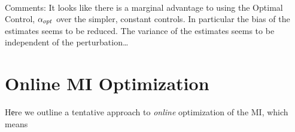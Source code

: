 \documentclass{article}
\begin{document}
\begin{table}
\\
\caption{Results for the estimates arising from simulations using various values
of $\a$ (opt, crit, max). In each sub-table there are $N_b$
parameter estimates for each distinct $\a$, with $N_s$ hitting times used to form an $\b-$estimate.
The 'true' value of $\b$ is $\b=1$. }
\label{tab:beta_estimates_from_hitting_times_different_alphas}
\end{table}     
% 

Comments: It looks like there is a marginal advantage to using the 
Optimal Control, ${\alpha}_{opt}$ over the simpler, constant controls. In particular
the bias of the estimates seems to be reduced. The variance of the estimates
seems to be independent of the perturbation\ldots 
 
\clearpage


\section{Online MI Optimization}
Hеre we outline a tentative approach to {\sl online} optimization of the MI,
which means
\end{document}
